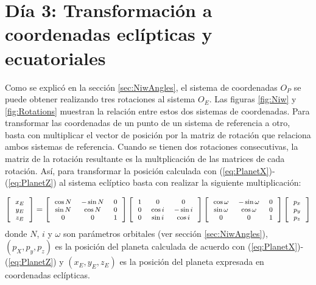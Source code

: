 \documentclass[a4paper,10pt]{article}
\begin{document}
\section{Día 3: Transformación a coordenadas eclípticas y ecuatoriales}
Como se explicó en la sección \ref{sec:NiwAngles}, el sistema de coordenadas $O_P$ se puede obtener realizando tres rotaciones al sistema $O_E$. Las figuras \ref{fig:Niw} y \ref{fig:Rotations} muestran la relación entre estos dos sistemas de coordenadas. Para transformar las coordenadas de un punto de un sistema de referencia a otro, basta con multiplicar el vector de posición por la matriz de rotación que relaciona ambos sistemas de referencia. Cuando se tienen dos rotaciones consecutivas, la matriz de la rotación resultante es la multplicación de las matrices de cada rotación. Así, para transformar la posición calculada con (\ref{eq:PlanetX})-(\ref{eq:PlanetZ}) al sistema eclíptico basta con realizar la siguiente multiplicación:

\begin{equation}
  \footnotesize
  \left[ \begin{tabular}{c} $x_E$\\$y_E$\\$z_E$\end{tabular}\right] =
  \left[ \begin{tabular}{ccc}
           $\cos N$ & $-\sin N$ & 0 \\
           $\sin N$ & $ \cos N$ & 0 \\
           $0$      & $0$       & 1
         \end{tabular}\right]
  \left[ \begin{tabular}{ccc}
           $1$      & $0$       & $0$ \\
           $0$      & $\cos i$ & $-\sin i$ \\
           $0$      & $\sin i$ & $ \cos i$
         \end{tabular}\right]
  \left[ \begin{tabular}{ccc}
           $\cos \omega$ & $-\sin \omega$ & 0 \\
           $\sin \omega$ & $ \cos \omega$ & 0 \\
           $0$      & $0$       & 1
         \end{tabular}\right]
       \left[ \begin{tabular}{c} $p_x$\\$p_y$\\$p_z$\end{tabular}\right]
       \label{eq:Planet2Ecliptic}
\end{equation}
donde $N$, $i$ y $\omega$ son  parámetros orbitales (ver sección \ref{sec:NiwAngles}), $(p_X, p_y, p_z)$ es la posición del planeta calculada de acuerdo con (\ref{eq:PlanetX})-(\ref{eq:PlanetZ}) y $(x_E, y_E, z_E)$ es la posición del planeta expresada en coordenadas eclípticas.
\end{document}
